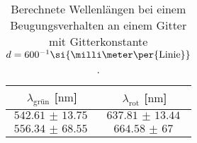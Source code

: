 \begin{table}
    \centering
    \caption{Berechnete Wellenlängen bei einem Beugungsverhalten an einem Gitter mit Gitterkonstante $\protect d = {600^{-1}}\si{\milli\meter\per{\text{Linie}}}$.}
    \label{tab:wave600}
    \begin{tabular}{c c}
        \toprule
        $\lambda_{\text{grün}}$ [$\si{\nano\meter}$] & $\lambda_{\text{rot}}$ [$\si{\nano\meter}$] \\
        \midrule
        $\SI{542.61(1375)}{}$ & $\SI{637.81(1344)}{}$ \\
        $\SI{556.34(6855)}{}$ & $\SI{664.58(6700)}{}$  \\
        \bottomrule    
    \end{tabular}
\end{table}

